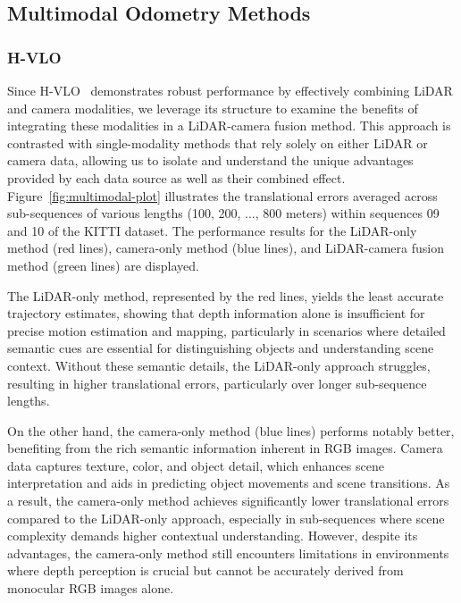 \documentclass[11pt,a4paper]{article}
\begin{document}



\subsection{Multimodal Odometry Methods}

\subsubsection{H-VLO}
Since H-VLO~\cite{hvlo} demonstrates robust performance by effectively combining LiDAR and camera modalities, we leverage its structure to examine the benefits of integrating these modalities in a LiDAR-camera fusion method. This approach is contrasted with single-modality methods that rely solely on either LiDAR or camera data, allowing us to isolate and understand the unique advantages provided by each data source as well as their combined effect. Figure~\ref{fig:multimodal-plot} illustrates the translational errors averaged across sub-sequences of various lengths (100, 200, ..., 800 meters) within sequences 09 and 10 of the KITTI dataset. The performance results for the LiDAR-only method (red lines), camera-only method (blue lines), and LiDAR-camera fusion method (green lines) are displayed.

The LiDAR-only method, represented by the red lines, yields the least accurate trajectory estimates, showing that depth information alone is insufficient for precise motion estimation and mapping, particularly in scenarios where detailed semantic cues are essential for distinguishing objects and understanding scene context. Without these semantic details, the LiDAR-only approach struggles, resulting in higher translational errors, particularly over longer sub-sequence lengths.

On the other hand, the camera-only method (blue lines) performs notably better, benefiting from the rich semantic information inherent in RGB images. Camera data captures texture, color, and object detail, which enhances scene interpretation and aids in predicting object movements and scene transitions. As a result, the camera-only method achieves significantly lower translational errors compared to the LiDAR-only approach, especially in sub-sequences where scene complexity demands higher contextual understanding. However, despite its advantages, the camera-only method still encounters limitations in environments where depth perception is crucial but cannot be accurately derived from monocular RGB images alone.
\end{document}
